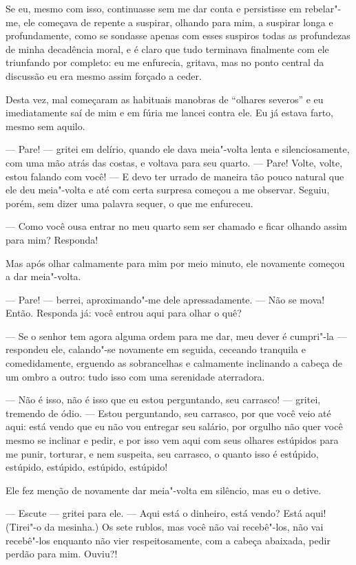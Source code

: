 Se eu, mesmo com isso, continuasse sem me dar conta e persistisse em
rebelar"-me, ele começava de repente a suspirar, olhando para mim, a
suspirar longa e profundamente, como se sondasse apenas com esses
suspiros todas as profundezas de minha decadência moral, e é claro que
tudo terminava finalmente com ele triunfando por completo: eu me
enfurecia, gritava, mas no ponto central da discussão eu era mesmo
assim forçado a ceder.

Desta vez, mal começaram as habituais manobras de “olhares severos” e eu
imediatamente saí de mim e em fúria me lancei contra ele. Eu já estava
farto, mesmo sem aquilo.

--- Pare! --- gritei em delírio, quando ele dava meia"-volta lenta e
silenciosamente, com uma mão atrás das costas, e voltava para seu
quarto. --- Pare! Volte, volte, estou falando com você! --- E devo ter
urrado de maneira tão pouco natural que ele deu meia"-volta e até com
certa surpresa começou a me observar. Seguiu, porém, sem dizer uma
palavra sequer, o que me enfureceu.

--- Como você ousa entrar no meu quarto sem ser chamado e ficar olhando
assim para mim? Responda!

Mas após olhar calmamente para mim por meio minuto, ele novamente
começou a dar meia"-volta.

--- Pare! --- berrei, aproximando"-me dele apressadamente. --- Não se mova!
Então. Responda já: você entrou aqui para olhar o quê?

--- Se o senhor tem agora alguma ordem para me dar, meu dever é cumpri"-la
--- respondeu ele, calando"-se novamente em seguida, ceceando tranquila e
comedidamente, erguendo as sobrancelhas e calmamente inclinando a
cabeça de um ombro a outro: tudo isso com uma serenidade aterradora.

--- Não é isso, não é isso que eu estou perguntando, seu carrasco! ---
gritei, tremendo de ódio. --- Estou perguntando, seu carrasco, por que
você veio até aqui: está vendo que eu não vou entregar seu salário, por
orgulho não quer você mesmo se inclinar e pedir, e por isso vem aqui
com seus olhares estúpidos para me punir, torturar, e nem suspeita,
seu carrasco, o quanto isso é estúpido, estúpido, estúpido, estúpido,
estúpido!

Ele fez menção de novamente dar meia"-volta em silêncio, mas eu o detive.

--- Escute --- gritei para ele. --- Aqui está o dinheiro, está vendo? Está
aqui! (Tirei"-o da mesinha.) Os sete rublos, mas você não vai
recebê"-los, não vai recebê"-los enquanto não vier respeitosamente, com
a cabeça abaixada, pedir perdão para mim. Ouviu?!

